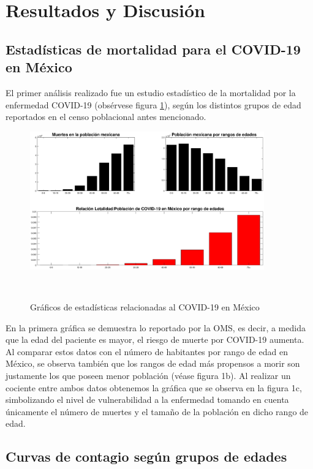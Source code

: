 \documentclass[12pt,a4paper]{article}
\begin{document}
\section{Resultados y Discusión}

\subsection{Estadísticas de mortalidad para el COVID-19 en México}
\setlength{\parindent}{0cm}
El primer análisis realizado fue un estudio estadístico de la mortalidad por la enfermedad COVID-19 (obsérvese figura \ref{Figura1}), según los distintos grupos de edad reportados en el censo poblacional antes mencionado. \\
\begin{figure}
\includegraphics[width = 0.9\textwidth]{Figura1.eps}
\centering
\caption{Gráficos de estadísticas relacionadas al COVID-19 en México} \\
\label{Figura1}
\end{figure}

En la primera gráfica se demuestra lo reportado por la OMS, es decir, a medida que la edad del paciente es mayor, el riesgo de muerte por COVID-19 aumenta. Al comparar estos datos con el número de habitantes por rango de edad en México, se observa también que los rangos de edad más propensos a morir son justamente los que poseen menor población (véase figura 1b). Al realizar un cociente entre ambos datos obtenemos la gráfica que se observa en la figura 1c, simbolizando el nivel de vulnerabilidad a la enfermedad tomando en cuenta únicamente el número de muertes y el tamaño de la población en dicho rango de edad.  
\setlength{\parindent}{1cm}

\subsection{Curvas de contagio según grupos de edades}
\setlength{\parindent}{0cm}
\end{document}
